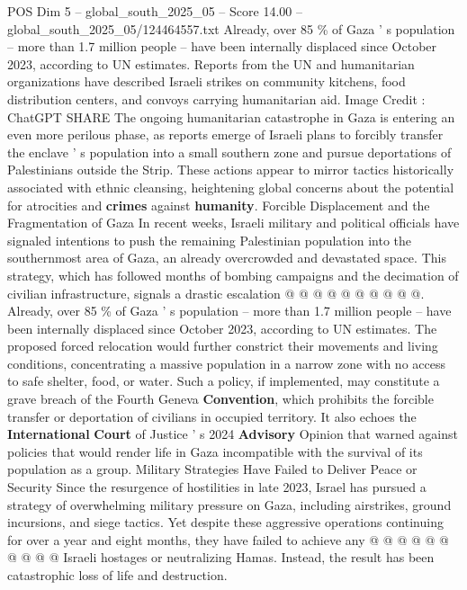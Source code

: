 \begin{textsample}{POS Dim 5 – global\_south\_2025\_05 – Score 14.00 – global\_south\_2025\_05/124464557.txt}  \label{ex:f5_pos_197}
Already, over 85 \% of Gaza ' s population -- more than 1.7 million people -- have been internally displaced since October 2023, according to UN estimates.
Reports from the UN and humanitarian organizations have described Israeli strikes on community kitchens, food distribution centers, and convoys carrying humanitarian aid.
Image Credit : ChatGPT SHARE The ongoing humanitarian catastrophe in Gaza is entering an even more perilous phase, as reports emerge of Israeli plans to forcibly transfer the enclave ' s population into a small southern zone and pursue deportations of Palestinians outside the Strip.
These actions appear to mirror tactics historically associated with ethnic cleansing, heightening global concerns about the potential for atrocities and \textbf{crimes} against \textbf{humanity}.
Forcible Displacement and the Fragmentation of Gaza In recent weeks, Israeli military and political officials have signaled intentions to push the remaining Palestinian population into the southernmost area of Gaza, an already overcrowded and devastated space.
This strategy, which has followed months of bombing campaigns and the decimation of civilian infrastructure, signals a drastic escalation @ @ @ @ @ @ @ @ @ @.
Already, over 85 \% of Gaza ' s population -- more than 1.7 million people -- have been internally displaced since October 2023, according to UN estimates.
The proposed forced relocation would further constrict their movements and living conditions, concentrating a massive population in a narrow zone with no access to safe shelter, food, or water.
Such a policy, if implemented, may constitute a grave breach of the Fourth Geneva \textbf{Convention}, which prohibits the forcible transfer or deportation of civilians in occupied territory.
It also echoes the \textbf{International} \textbf{Court} of Justice ' s 2024 \textbf{Advisory} Opinion that warned against policies that would render life in Gaza incompatible with the survival of its population as a group.
Military Strategies Have Failed to Deliver Peace or Security Since the resurgence of hostilities in late 2023, Israel has pursued a strategy of overwhelming military pressure on Gaza, including airstrikes, ground incursions, and siege tactics.
Yet despite these aggressive operations continuing for over a year and eight months, they have failed to achieve any @ @ @ @ @ @ @ @ @ @ Israeli hostages or neutralizing Hamas.
Instead, the result has been catastrophic loss of life and destruction.

\end{textsample}
